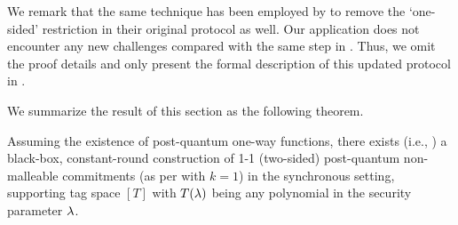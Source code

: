 We remark that the same technique has been employed by \cite{FOCS:LPY23} to remove the `one-sided' restriction in their original protocol as well. Our application does not encounter any new challenges compared with the same step in \cite{FOCS:LPY23}.  Thus, we omit the proof details and only present the formal description of this updated protocol in .

We summarize the result of this section as the following theorem.

\begin{theorem}\label{thm:two-sided:non-malleability}
  Assuming the existence of post-quantum one-way functions, there exists (i.e., ) a black-box, constant-round construction of 1-1 (two-sided) post-quantum non-malleable commitments (as per  with $k=1$) in the synchronous setting,  supporting tag space $[T]$ with $T(\lambda)$ being any polynomial in the security parameter $\lambda$.
\end{theorem} 